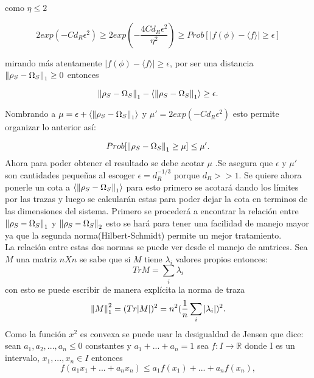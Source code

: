 como $\eta \le 2$ 

\begin{equation}
2exp(-Cd_{R}\epsilon^2) \ge 2exp(-\frac{4Cd_{R}\epsilon^2}{\eta^2}) \ge Prob[|f(\phi)- \langle f \rangle| \ge \epsilon ]
\end{equation}

mirando más atentamente  $|f(\phi)- \langle f \rangle| \ge \epsilon $, por ser  una distancia $\norm{\rho_{S} -\Omega_{S}}_{1} \ge 0$ entonces


\begin{equation}
\norm{\rho_{S} -\Omega_{S}}_{1}- \langle \norm{\rho_{S} -\Omega_{S}}_{1} \rangle \ge \epsilon.
\end{equation}

Nombrando a $\mu = \epsilon + \langle \norm{\rho_{S} -\Omega_{S}}_{1} \rangle $ y $\mu'=2 exp(-Cd_{R}\epsilon^2)$ esto permite organizar lo anterior así:

\begin{equation}
Prob[\norm{\rho_{S} -\Omega_{S}}_{1} \ge \mu] \le \mu'.
\end{equation}
Ahora para poder obtener el resultado se debe acotar $\mu$ .Se asegura que $\epsilon$ y $\mu'$ son cantidades pequeñas al escoger $\epsilon=d_{R}^{-1/3}$ porque $d_{R}>>1$. Se quiere ahora ponerle un cota a $\langle \norm{\rho_{S} -\Omega_{S}}_{1} \rangle$ para esto primero se acotará dando los límites por las trazas y luego se calcularán estas para poder dejar la cota en terminos de las dimensiones del sistema. Primero se procederá a encontrar la relación entre $\norm{\rho_{S} -\Omega_{S}}_{1}$ y $\norm{\rho_{S} -\Omega_{S}}_{2}$ esto se hará para tener una facilidad de manejo mayor ya que la segunda norma(Hilbert-Schmidt) permite un mejor tratamiento.\\
La relación entre estas dos normas se puede ver desde el manejo de amtrices. Sea $M$ una matriz $nX	n$ se sabe que si $M$ tiene $\lambda_{i}$ valores propios entonces:
\begin{equation}
Tr M= \sum_{i} \lambda_{i} 
\end{equation}
con esto se puede escribir de manera explícita la norma de traza 
\begin{equation}
\norm{M}_{1}^2=(Tr|M|)^{2}=n^{2} (\frac{1}{n}\sum_{i} |\lambda_{i}|)^{2}.
\end{equation}
Como la función $x^{2}$ es convexa se puede usar la desigualdad de Jensen que dice: sean $a_{1},a_{2},...,a_{n} \le 0$ constantes y $a_{1} +...+a_{n}=1$ sea $f: I \to \mathbb{R}$ donde I es un intervalo, $x_{1},...,x_{n} \in I$ entonces
\begin{equation}
f(a_{1}x_{1}+...+a_{n}x_{n}) \le a_{1}f(x_{1})+...+a_{n}f(x_{n}),
\end{equation}


